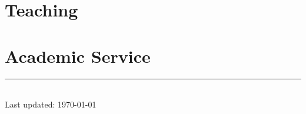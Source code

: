 \documentclass[11pt]{article}
\newif\ifshowinvitedtalks
\begin{document}
\section*{Teaching}
\label{teaching}

\ifshowinvitedtalks
  \pdfbookmark[1]{Invited Talks}{invited-talks}
  \section*{Invited Talks}
  \label{invited-talks}
  
\fi
{}
\section*{Academic Service}
\label{service}

\vfill
\centering
\rule{0.25\linewidth}{0.4pt}\\
\medskip
Last updated: \today
\end{document}
